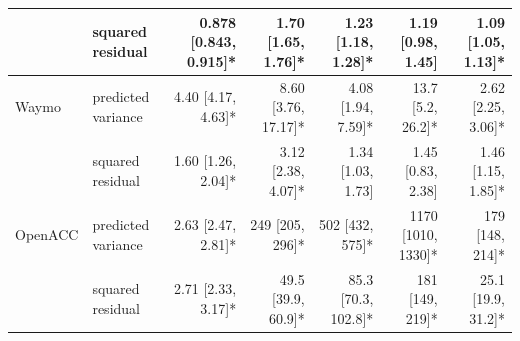 \begin{table}[htbp]
\begin{tabular}{llrrrrr}
 & squared residual & 0.878 [0.843, 0.915]* & 1.70 [1.65, 1.76]* & 1.23 [1.18, 1.28]* & 1.19 [0.98, 1.45] & 1.09 [1.05, 1.13]* \\
\midrule
Waymo & predicted variance & 4.40 [4.17, 4.63]* & 8.60 [3.76, 17.17]* & 4.08 [1.94, 7.59]* & 13.7 [5.2, 26.2]* & 2.62 [2.25, 3.06]* \\
 & squared residual & 1.60 [1.26, 2.04]* & 3.12 [2.38, 4.07]* & 1.34 [1.03, 1.73] & 1.45 [0.83, 2.38] & 1.46 [1.15, 1.85]* \\
\midrule
OpenACC & predicted variance & 2.63 [2.47, 2.81]* & 249 [205, 296]* & 502 [432, 575]* & 1170 [1010, 1330]* & 179 [148, 214]* \\
 & squared residual & 2.71 [2.33, 3.17]* & 49.5 [39.9, 60.9]* & 85.3 [70.3, 102.8]* & 181 [149, 219]* & 25.1 [19.9, 31.2]* \\
\bottomrule
\end{tabular}
\end{table}
